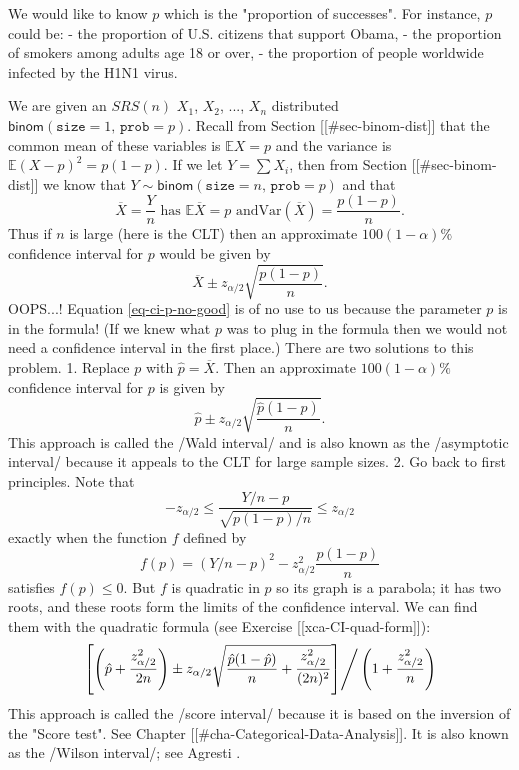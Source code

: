 We would like to know \(p\) which is the "proportion of
successes". For instance, \(p\) could be:
- the proportion of U.S. citizens that support Obama,
- the proportion of smokers among adults age 18 or over,
- the proportion of people worldwide infected by the H1N1 virus.

We are given an \(SRS(n)\) \(X_{1}\), \(X_{2}\), ..., \(X_{n}\)
distributed
\(\mathsf{binom}(\mathtt{size}=1,\,\mathtt{prob}=p)\). Recall from
Section [[#sec-binom-dist]] that the common mean of these variables
is \(\mathbb{E} X=p\) and the variance is
\(\mathbb{E}(X-p)^{2}=p(1-p)\). If we let \(Y=\sum X_{i}\), then from
Section [[#sec-binom-dist]] we know that
\(Y\sim\mathsf{binom}(\mathtt{size}=n,\,\mathtt{prob}=p)\) and that \[
\overline{X}=\frac{Y}{n}\mbox{ has }\mathbb{E}\overline{X}=p\mbox{ and
}\mathrm{Var}(\overline{X})=\frac{p(1-p)}{n}.  \] Thus if \(n\) is
large (here is the CLT) then an approximate \(100(1-\alpha)\%\)
confidence interval for \(p\) would be given by
\begin{equation}
\label{eq-ci-p-no-good}
\overline{X}\pm z_{\alpha/2}\sqrt{\frac{p(1-p)}{n}}.
\end{equation}
OOPS...! Equation \eqref{eq-ci-p-no-good} is of no use to us because the
 parameter \(p\) is in the formula! (If we knew what
\(p\) was to plug in the formula then we would not need a confidence
interval in the first place.) There are two solutions to this problem.
1. Replace \(p\) with \(\hat{p}=\overline{X}\). Then an approximate
   \(100(1-\alpha)\%\) confidence interval for \(p\) is given by
   \begin{equation}
   \hat{p}\pm z_{\alpha/2}\sqrt{\frac{\hat{p}(1-\hat{p})}{n}}.
   \end{equation}
   This approach is called the /Wald interval/ and is also known as
   the /asymptotic interval/ because it appeals to the CLT for large
   sample sizes.
2. Go back to first principles. Note that \[
   -z_{\alpha/2}\leq\frac{Y/n-p}{\sqrt{p(1-p)/n}}\leq z_{\alpha/2} \]
   exactly when the function \(f\) defined by \[
   f(p)=\left(Y/n-p\right)^{2}-z_{\alpha/2}^{2}\frac{p(1-p)}{n} \]
   satisfies \(f(p)\leq0\). But \(f\) is quadratic in \(p\) so its
   graph is a parabola; it has two roots, and these roots form the
   limits of the confidence interval. We can find them with the
   quadratic formula (see Exercise [[xca-CI-quad-form]]):
   \begin{equation}
   \left.\left[\left(\hat{p}+\frac{z_{\alpha/2}^{2}}{2n}\right)\pm z_{\alpha/2}\sqrt{\frac{\hat{p}(1-\hat{p})}{n}+\frac{z_{\alpha/2}^{2}}{(2n)^{2}}}\right]\right/ \left(1+\frac{z_{\alpha/2}^{2}}{n}\right)
   \end{equation}
   This approach is called the /score interval/ because it is based on
   the inversion of the "Score test". See Chapter
   [[#cha-Categorical-Data-Analysis]]. It is also known as the /Wilson
   interval/; see Agresti \cite{Agresti2002}.


